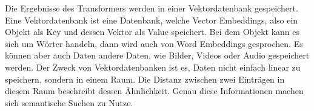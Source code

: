 Die Ergebnisse des Transformers werden in einer Vektordatenbank gespeichert. Eine Vektordatenbank ist eine Datenbank, welche Vector Embeddings, also ein Objekt als Key und dessen Vektor als Value speichert. Bei dem Objekt kann es sich um Wörter handeln, dann wird auch von Word Embeddings gesprochen. Es können aber auch Daten andere Daten, wie Bilder, Videos oder Audio gespeichert werden. Der Zweck von Vektordatenbanken ist es, Daten nicht einfach linear zu speichern, sondern in einem Raum. Die Distanz zwischen zwei Einträgen in diesem Raum beschreibt dessen Ähnlichkeit. Genau diese Informationen machen sich semantische Suchen zu Nutze.
